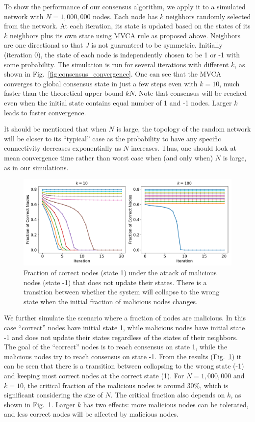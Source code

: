 \documentclass[reprint,pre,aps]{revtex4-1}
\begin{document}
To show the performance of our consensus algorithm, we apply it to a simulated network with $N=1,000,000$ nodes. Each node has $k$ neighbors randomly selected from the network. At each iteration, its state is updated based on the states of its $k$ neighbors plus its own state using MVCA rule as proposed above. Neighbors are one directional so that $J$ is not guaranteed to be symmetric. Initially (iteration 0), the state of each node is independently chosen to be 1 or -1 with some probability. The simulation is run for several iterations with different $k$, as shown in Fig.~\ref{fig:consensus_convergence}. One can see that the MVCA converges to global consensus state in just a few steps even with $k = 10$, much faster than the theoretical upper bound $kN$. Note that consensus will be reached even when the initial state contains equal number of 1 and -1 nodes. Larger $k$ leads to faster convergence.

It should be mentioned that when $N$ is large, the topology of the random network will be closer to its “typical” case as the probability to have any specific connectivity decreases exponentially as $N$ increases. Thus, one should look at mean convergence time rather than worst case when (and only when) $N$ is large, as in our simulations.

\begin{figure}[!htp]
\centering
\includegraphics[width=\linewidth]{fig/consensus_malicious}
\caption{Fraction of correct nodes (state 1) under the attack of malicious nodes (state -1) that does not update their states. There is a transition between whether the system will collapse to the wrong state when the initial fraction of malicious nodes changes.}
\label{fig:consensus_malicious}
\end{figure}

We further simulate the scenario where a fraction of nodes are malicious. In this case “correct” nodes have initial state 1, while malicious nodes have initial state -1 and does not update their states regardless of the states of their neighbors. The goal of the “correct” nodes is to reach consensus on state 1, while the malicious nodes try to reach consensus on state -1. From the results (Fig.~\ref{fig:consensus_malicious}) it can be seen that there is a transition between collapsing to the wrong state (-1) and keeping most correct nodes at the correct state (1). For $N = 1,000,000$ and $k = 10$, the critical fraction of the malicious nodes is around 30\%, which is significant considering the size of $N$. The critical fraction also depends on $k$, as shown in Fig.~\ref{fig:consensus_malicious}. Larger $k$ has two effects: more malicious nodes can be tolerated, and less correct nodes will be affected by malicious nodes.
\end{document}
